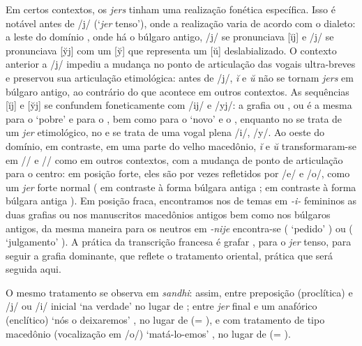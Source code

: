 Em certos contextos, os \emph{jers} tinham uma realização fonética específica.
Isso é notável antes de /j/ (`\emph{jer} tenso'), onde a realização varia de
acordo com o dialeto: a leste do domínio , onde há o búlgaro
antigo, /\jeri{}j/ se pronunciava [ĭj] e /\jeru{}j/ se pronunciava [y̆j] com um
	[y̆] que representa um [ŭ] deslabializado.
O contexto anterior a /j/ impediu a mudança no ponto de articulação das vogais
ultra-breves e preservou sua articulação etimológica: antes de /j/, \emph{ĭ} e
\emph{ŭ} não se tornam \emph{jers} em búlgaro antigo, ao contrário do que
acontece em outros contextos.
As sequências [ĭj] e [y̆j] se confundem foneticamente com /ij/ e /yj/: a grafia
 ou ,  ou  é a mesma para o
  `pobre' e para o
 , bem como para o
  `novo' e o 
, enquanto no  se trata de um \emph{jer}
etimológico, no  e  se trata de uma vogal plena
/i/, /y/.
Ao oeste do domínio, em contraste, em uma parte do velho macedônio, \emph{ĭ} e
\emph{ŭ} transformaram-se em /\jeri{}/ e /\jeru{}/ como em outros contextos, com
a mudança de ponto de articulação para o centro: em posição forte, eles são por
vezes refletidos por /e/ e /o/, como um \emph{jer} forte normal
(  em contraste à forma búlgara antiga
;   em
contraste à forma búlgara antiga ).
Em posição fraca, encontramos nos  de temas em \emph{-i-}
femininos as duas grafias  ou  nos
manuscritos macedônios antigos bem como nos búlgaros antigos, da mesma maneira
para os neutros em \emph{-nije} encontra-se  (
`pedido'  ) ou 
( `julgamento'  ).
A prática da transcrição francesa é grafar ,  para o
\emph{jer} tenso, para seguir a grafia dominante, que reflete o tratamento
oriental, prática que será seguida aqui.

O mesmo tratamento se observa em \emph{sandhi}: assim, entre preposição
(proclítica) e /j/ ou /i/ inicial  `na verdade'
  no lugar de ;
entre \emph{jer} final e um anafórico (enclítico)  `nós o
deixaremos'  , no lugar de
 (= ), e com tratamento de tipo macedônio
(vocalização em /o/)  `matá-lo-emos' 
, no lugar de  (= ).

